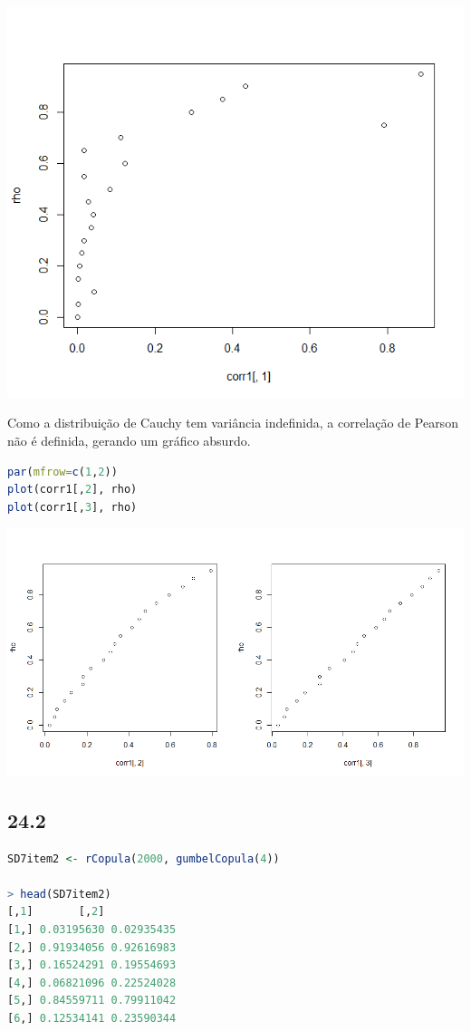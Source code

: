 \documentclass[12pt]{article}
\begin{document}
\begin{center}
	\includegraphics*[scale=0.8]{5.png}
\end{center}

Como a distribuição de Cauchy tem variância indefinida, a correlação de Pearson não é definida, gerando um gráfico absurdo.

\begin{lstlisting}[language=R]
par(mfrow=c(1,2))
plot(corr1[,2], rho)
plot(corr1[,3], rho)
\end{lstlisting}

\begin{center}
	\includegraphics*[scale=0.6]{6.png}
\end{center}

\subsection*{24.2}
\begin{lstlisting}[language=R]
SD7item2 <- rCopula(2000, gumbelCopula(4))

> head(SD7item2)
[,1]       [,2]
[1,] 0.03195630 0.02935435
[2,] 0.91934056 0.92616983
[3,] 0.16524291 0.19554693
[4,] 0.06821096 0.22524028
[5,] 0.84559711 0.79911042
[6,] 0.12534141 0.23590344
\end{lstlisting}
\end{document}
